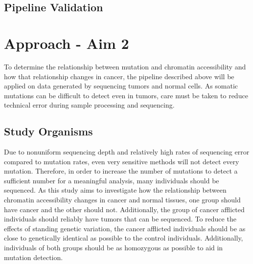 



\subsection{Pipeline Validation}



\section{Approach - Aim 2}
To determine the relationship between mutation and chromatin accessibility and how that relationship changes in cancer, the pipeline described above will be applied on data generated by sequencing tumors and normal cells. As somatic mutations can be difficult to detect even in tumors, care must be taken to reduce technical error during sample processing and sequencing.

\subsection{Study Organisms}
Due to nonuniform sequencing depth and relatively high rates of sequencing error compared to mutation rates, even very sensitive methods will not detect every mutation. Therefore, in order to increase the number of mutations to detect a sufficient number for a meaningful analysis, many individuals should be sequenced. As this study aims to investigate how the relationship between chromatin accessibility changes in cancer and normal tissues, one group should have cancer and the other should not.
Additionally, the group of cancer afflicted individuals should reliably have tumors that can be sequenced. To reduce the effects of standing genetic variation, the cancer afflicted individuals should be as close to genetically identical as possible to the control individuals. Additionally, individuals of both groups should be as homozygous as possible to aid in mutation detection.

